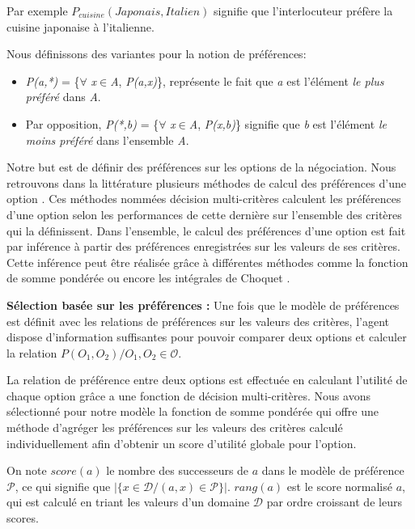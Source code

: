 \documentclass [french]{sig-alternate-05-2015}
\begin{document}
Par exemple $P_{cuisine} (Japonais, Italien)$ signifie que l'interlocuteur préfère la cuisine japonaise à l'italienne. 

\par Nous définissons des variantes pour la notion de préférences:
\begin{itemize}
	\item  \emph{P(a,*)}  = \{$\forall$ \emph{x}$\in$\emph{A}, \emph{P(a,x)}\}, représente le fait que  \emph{a} est l'élément  \textit{le plus préféré} dans \emph{A}.
	\item Par opposition, \emph{P(*,b)} = \{$\forall$ \emph{x}$\in$\emph{A}, \emph{P(x,b)}\} signifie que \emph{b} est l'élément \textit{le moins préféré} dans l'ensemble \emph{A}. 
\end{itemize}


\par Notre but est de définir des préférences sur les options de la négociation.  Nous retrouvons dans la littérature plusieurs méthodes de calcul des préférences d'une option \cite{dodgson2009multi}. Ces méthodes nommées décision multi-critères calculent les préférences d'une option selon les performances de cette dernière sur l'ensemble des critères qui la définissent. Dans l'ensemble\cite{dodgson2009multi}, le calcul des préférences d'une option est fait par inférence à partir des préférences enregistrées sur les valeurs de ses critères. Cette inférence peut être réalisée grâce à différentes méthodes comme la fonction de somme pondérée \cite{yager2012ordered} ou encore les intégrales de Choquet \cite{chouquet1953}. \\

\par  \textbf{Sélection basée sur les préférences :} Une fois que le modèle de préférences est définit avec les relations de préférences sur les valeurs des critères, l'agent dispose d'information suffisantes pour pouvoir comparer deux options et calculer la relation 
$P(O_1, O_2) / O_1, O_2 \in \mathcal{O} $.

La relation de préférence entre deux options est effectuée en calculant l'utilité de chaque option grâce a une fonction de décision multi-critères. 
Nous avons sélectionné pour notre modèle la fonction de somme pondérée \cite{yager2012ordered} qui offre une méthode d'agréger les préférences sur les valeurs des critères calculé individuellement afin d'obtenir un score d'utilité globale pour l'option.
 
\par On note  $score(a)$ le nombre des successeurs de  $a$  dans le modèle de préférence $\mathcal{P}$, ce qui signifie que $|\{x \in \mathcal{D} / (a,x) \in \mathcal{P}\}|$. 
$rang(a)$ est le score normalisé $a$, qui est calculé en triant les valeurs d'un domaine $\mathcal{D}$ par ordre croissant de leurs scores. 
\end{document}
